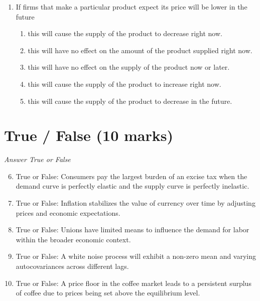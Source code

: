 \documentclass[12pt]{article}
\begin{document}
\begin{enumerate}[label=\arabic*.]
\begin{enumerate}[label=(\alph*)]
    \item A decrease in both supply and demand and an ambiguous change in interest rates.
    \item An increase in supply lowering the interest rate.
    \item A decrease in demand increasing the interest rate.
    \item An increase in demand increasing the interest rate.
    \item A decrease in supply increasing the interest rate.
\end{enumerate}
\item If firms that make a particular product expect its price will be lower in the future
\begin{enumerate}[label=(\alph*)]
    \item this will cause the supply of the product to decrease right now.
    \item this will have no effect on the amount of the product supplied right now.
    \item this will have no effect on the supply of the product now or later.
    \item this will cause the supply of the product to increase right now.
    \item this will cause the supply of the product to decrease in the future.
\end{enumerate}
\end{enumerate}

\section*{True / False (10 marks)}
\textit{Answer True or False}
\begin{enumerate}[label=\arabic*.]
\setcounter{enumi}{5}
\item True or False: Consumers pay the largest burden of an excise tax when the demand curve is perfectly elastic and the supply curve is perfectly inelastic.
\item True or False: Inflation stabilizes the value of currency over time by adjusting prices and economic expectations.
\item True or False: Unions have limited means to influence the demand for labor within the broader economic context.
\item True or False: A white noise process will exhibit a non-zero mean and varying autocovariances across different lags.
\item True or False: A price floor in the coffee market leads to a persistent surplus of coffee due to prices being set above the equilibrium level.
\end{enumerate}
\end{document}
